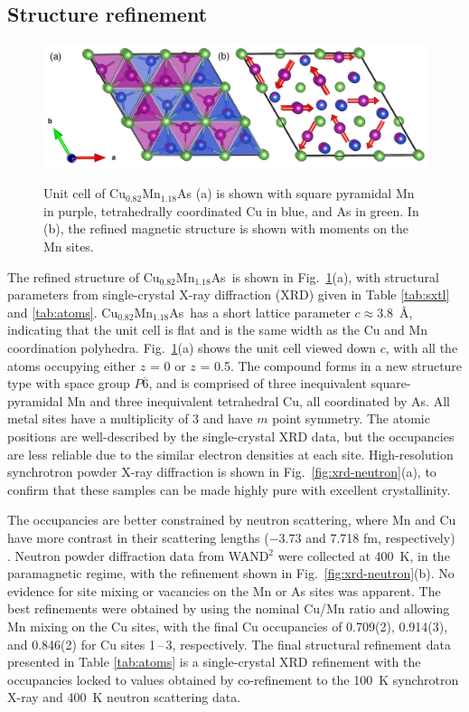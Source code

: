 \documentclass[10pt,doublespacing,edeposit]{uiucthesis2020}
\newcommand*{\cumnas}{Cu$_{0.82}$Mn$_{1.18}$As}
\begin{document}
\begin{mainmatter}
\subsection{Structure refinement}

\begin{figure}
\centering\includegraphics[width=\columnwidth]{figures/ch5/h-cumnas_1x1_cells_v2.png} \\
\caption{\label{fig:unitcell}
Unit cell of Cu$_{0.82}$Mn$_{1.18}$As (a) is shown with square pyramidal Mn in purple, tetrahedrally coordinated Cu in blue, and As in green.
In (b), the refined magnetic structure is shown with moments on the Mn sites.
} 
\end{figure}

The refined structure of \cumnas\ is shown in Fig.\ \ref{fig:unitcell}(a), with structural parameters from single-crystal X-ray diffraction (XRD) given in Table \ref{tab:sxtl} and \ref{tab:atoms}.
{\color{black}\cumnas\ has a short lattice parameter $c \approx 3.8$~\AA, indicating that the unit cell is flat and is the same width as the Cu and Mn coordination polyhedra. Fig.\ \ref{fig:unitcell}(a) shows the unit cell viewed down $c$, with all the atoms occupying either $z$ = 0 or $z$ = 0.5.}
The compound forms in a new structure type with space group $P\overline{6}$, and is comprised of three inequivalent square-pyramidal Mn and three inequivalent tetrahedral Cu, all coordinated by As.
All metal sites have a multiplicity of 3 {\color{black} and have $m$ point symmetry}. The atomic positions are well-described by the single-crystal XRD data, but the occupancies are less reliable due to the similar electron densities at each site.  
High-resolution synchrotron powder X-ray diffraction is shown in Fig.\ \ref{fig:xrd-neutron}(a), to confirm that these samples can be made highly pure with excellent crystallinity.

The occupancies are better constrained by neutron scattering, where Mn and Cu have more contrast in their scattering lengths ($-3.73$ and 7.718 fm, respectively) \cite{sears_neutron_1992}.
Neutron powder diffraction data from WAND$^2$ were collected at 400~K, in the paramagnetic regime, with the refinement shown in Fig.\ \ref{fig:xrd-neutron}(b). 
No evidence for site mixing or vacancies on the Mn or As sites was apparent. 
The best refinements were obtained by using the nominal Cu/Mn ratio and allowing Mn mixing on the Cu sites, with the final Cu occupancies of 0.709(2), 0.914(3), and 0.846(2) for Cu sites 1\,--\,3, respectively.
The final structural refinement data presented in Table \ref{tab:atoms} is a single-crystal XRD refinement with the occupancies locked to values obtained by co-refinement to the 100~K synchrotron X-ray and 400~K neutron scattering data. 


\end{mainmatter}
\end{document}
